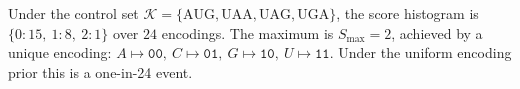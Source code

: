 Under the control set $\mathcal{K}=\{\mathrm{AUG,UAA,UAG,UGA}\}$, the score histogram is $\{0:15,\ 1:8,\ 2:1\}$ over $24$ encodings. The maximum is $S_{\max}=2$, achieved by a unique encoding: $A\mapsto \texttt{00},\ C\mapsto \texttt{01},\ G\mapsto \texttt{10},\ U\mapsto \texttt{11}$. Under the uniform encoding prior this is a one-in-24 event.
